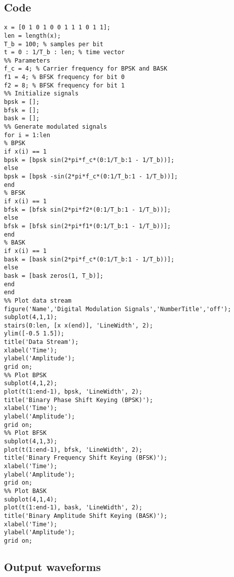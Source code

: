 \documentclass[12pt,a4paper]{report}
\begin{document}
\subsection*{Code}
\begin{verbatim}
x = [0 1 0 1 0 0 1 1 1 0 1 1];
len = length(x);
T_b = 100; % samples per bit
t = 0 : 1/T_b : len; % time vector
%% Parameters
f_c = 4; % Carrier frequency for BPSK and BASK
f1 = 4; % BFSK frequency for bit 0
f2 = 8; % BFSK frequency for bit 1
%% Initialize signals
bpsk = [];
bfsk = [];
bask = [];
%% Generate modulated signals
for i = 1:len
% BPSK
if x(i) == 1
bpsk = [bpsk sin(2*pi*f_c*(0:1/T_b:1 - 1/T_b))];
else
bpsk = [bpsk -sin(2*pi*f_c*(0:1/T_b:1 - 1/T_b))];
end
% BFSK
if x(i) == 1
bfsk = [bfsk sin(2*pi*f2*(0:1/T_b:1 - 1/T_b))];
else
bfsk = [bfsk sin(2*pi*f1*(0:1/T_b:1 - 1/T_b))];
end
% BASK
if x(i) == 1
bask = [bask sin(2*pi*f_c*(0:1/T_b:1 - 1/T_b))];
else
bask = [bask zeros(1, T_b)];
end
end
%% Plot data stream
figure('Name','Digital Modulation Signals','NumberTitle','off');
subplot(4,1,1);
stairs(0:len, [x x(end)], 'LineWidth', 2);
ylim([-0.5 1.5]);
title('Data Stream');
xlabel('Time');
ylabel('Amplitude');
grid on;
%% Plot BPSK
subplot(4,1,2);
plot(t(1:end-1), bpsk, 'LineWidth', 2);
title('Binary Phase Shift Keying (BPSK)');
xlabel('Time');
ylabel('Amplitude');
grid on;
%% Plot BFSK
subplot(4,1,3);
plot(t(1:end-1), bfsk, 'LineWidth', 2);
title('Binary Frequency Shift Keying (BFSK)');
xlabel('Time');
ylabel('Amplitude');
grid on;
%% Plot BASK
subplot(4,1,4);
plot(t(1:end-1), bask, 'LineWidth', 2);
title('Binary Amplitude Shift Keying (BASK)');
xlabel('Time');
ylabel('Amplitude');
grid on;
\end{verbatim}

\subsection*{Output waveforms}
\begin{figure*}[!h]
    
\end{figure*}
\end{document}

